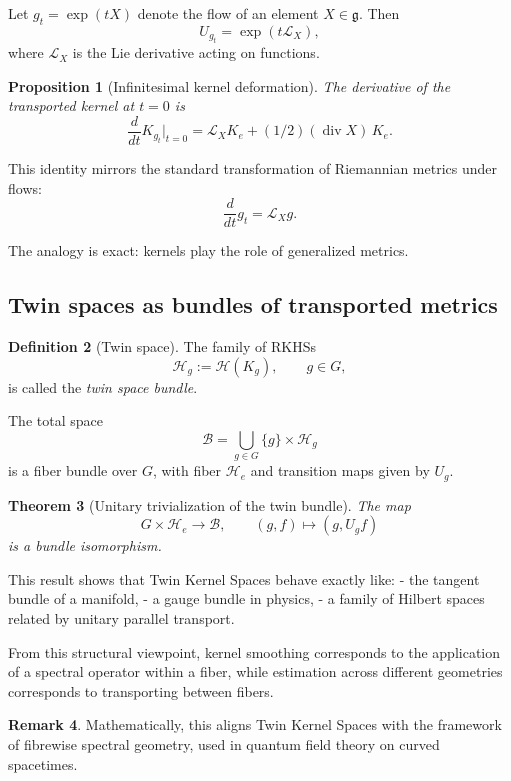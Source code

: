 \documentclass[11pt]{article}
\newtheorem{theorem}{Theorem}[section]
\newtheorem{proposition}[theorem]{Proposition}
\theoremstyle{definition}
\newtheorem{definition}[theorem]{Definition}
\newtheorem{remark}[theorem]{Remark}
\begin{document}
Let $g_t=\exp(tX)$ denote the flow of an element $X\in\mathfrak{g}$.
Then
\[
U_{g_t} = \exp(t \mathcal{L}_X),
\]
where $\mathcal{L}_X$ is the Lie derivative acting on functions.

\begin{proposition}[Infinitesimal kernel deformation]
	The derivative of the transported kernel at $t=0$ is
	\[
	\frac{d}{dt}K_{g_t}\Big|_{t=0}
	= \mathcal{L}_X K_e + (1/2)(\operatorname{div}X)\,K_e.
	\]
\end{proposition}

This identity mirrors the standard transformation of Riemannian metrics under flows:
\[
\frac{d}{dt}g_t = \mathcal{L}_X g.
\]

The analogy is exact: kernels play the role of generalized metrics.

\subsection{Twin spaces as bundles of transported metrics}

\begin{definition}[Twin space]
	The family of RKHSs
	\[
	\mathcal{H}_g := \mathcal{H}(K_g), \qquad g\in G,
	\]
	is called the \emph{twin space bundle}.
\end{definition}

The total space
\[
\mathcal{B} = \bigcup_{g\in G} \{g\}\times \mathcal{H}_g
\]
is a fiber bundle over $G$, with fiber $\mathcal{H}_e$ and transition maps given by $U_g$.

\begin{theorem}[Unitary trivialization of the twin bundle]
	The map
	\[
	G\times \mathcal{H}_e \to \mathcal{B},\qquad (g,f)\mapsto (g,U_g f)
	\]
	is a bundle isomorphism.
\end{theorem}

This result shows that Twin Kernel Spaces behave exactly like:
- the tangent bundle of a manifold,
- a gauge bundle in physics,
- a family of Hilbert spaces related by unitary parallel transport.

From this structural viewpoint, kernel smoothing corresponds to the application of a spectral operator within a fiber, while estimation across different geometries corresponds to transporting between fibers.

\begin{remark}
	Mathematically, this aligns Twin Kernel Spaces with the framework of fibrewise spectral geometry, used in quantum field theory on curved spacetimes.
\end{remark}
\end{document}
